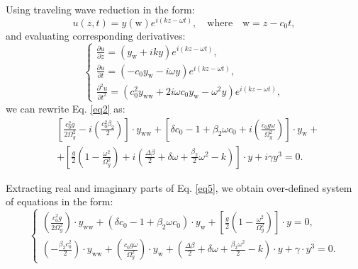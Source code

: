 \documentclass{article}
\begin{document}
        Using traveling wave reduction in the form:
        \begin{equation} \label{eq3}
            u\left(z, t\right) = y(\mathrm{w}) e^{i\left(k z-\omega t\right)}, \quad \text{where} \quad \mathrm{w} = z - c_{0} t,
        \end{equation}
        and evaluating corresponding derivatives:
        \begin{equation} \label{eq4}
            \begin{cases}
                \displaystyle
                \frac{\partial u}{\partial z} = \left(y_{\mathrm{w}} + i k y\right) e^{i\left(k z-\omega t\right)},\\
                \displaystyle
                \frac{\partial u}{\partial t} = \left(-c_{0} y_{\mathrm{w}} - i \omega y\right) e^{i\left(k z-\omega t\right)}, \\
                \displaystyle
                \frac{\partial^2 u}{\partial t^2} = \left(c^{2}_{0}y_{\mathrm{ww}} + 2 i\omega c_{0} y_{\mathrm{w}} - \omega^{2}y\right) e^{i\left(k z-\omega t\right)},
            \end{cases}
        \end{equation}
        we can rewrite Eq. \ref{eq2} as:
        \begin{equation} \label{eq5}
            \begin{split}
                &\left[\frac{c^{2}_{0} g}{2 \Omega^2_{g}} -i \left(\frac{c^2_{0}\beta_{2}} {2}\right)\right] \cdot y_{\mathrm{ww}} +
                \left[\delta c_{0} - 1 + \beta_{2} \omega c_{0} + i \left(\frac{c_{0} g \omega}{\Omega^2_{g}}\right)\right] \cdot y_{\mathrm{w}} +\\
                & + \left[\frac{g}{2}\left(1-\frac{\omega^{2}}{\Omega^2_{g}}\right) + i \left(\frac{\Delta \beta}{2}+\delta \omega + \frac{\beta_{2}}{2} \omega^{2} -k\right)\right]\cdot y +
                i \gamma y^{3} = 0.
            \end{split}
        \end{equation}

        Extracting real and imaginary parts of  Eq. \ref{eq5}, we obtain over-defined system of equations in the form:
        \begin{equation} \label{eq6}
            \begin{cases}
                \displaystyle \left(\frac{c^{2}_{0} g}{2 \Omega^2_{g}}\right) \cdot y_{\mathrm{ww}} + \left(\delta c_{0} - 1 + \beta_{2} \omega c_{0}\right) \cdot y_{\mathrm{w}} + \left[\frac{g}{2}\left(1-\frac{\omega^{2}}{\Omega^2_{g}}\right)\right] \cdot y = 0,\\
                \displaystyle \left(-\frac{\beta_{2} c^{2}_{0}}{2}\right) \cdot y_{\mathrm{ww}} + \left(\frac{c_{0} g \omega}{\Omega^2_{g}}\right) \cdot y_{\mathrm{w}} + \left(\frac{\Delta \beta}{2} + \delta \omega + \frac{\beta_{2} \omega^{2}}{2} - k\right) \cdot y + \gamma \cdot y^3 = 0.
            \end{cases}
        \end{equation}
\end{document}
